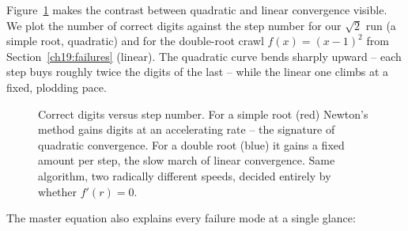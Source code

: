 Figure~\ref{ch19:fig-convergence} makes the contrast between quadratic and linear
convergence visible. We plot the number of correct digits against the step number
for our $\sqrt2$ run (a simple root, quadratic) and for the double-root crawl
$f(x)=(x-1)^2$ from Section~\ref{ch19:failures} (linear). The quadratic curve
bends sharply upward -- each step buys roughly twice the digits of the last -- while
the linear one climbs at a fixed, plodding pace.

\begin{figure}[H]
\centering
{}
\caption{Correct digits versus step number. For a simple root (red) Newton's method
gains digits at an accelerating rate -- the signature of quadratic convergence. For a
double root (blue) it gains a fixed amount per step, the slow march of linear
convergence. Same algorithm, two radically different speeds, decided entirely by
whether $f'(r)=0$.}
\label{ch19:fig-convergence}
\end{figure}

The master equation also explains every failure mode at a single glance:


